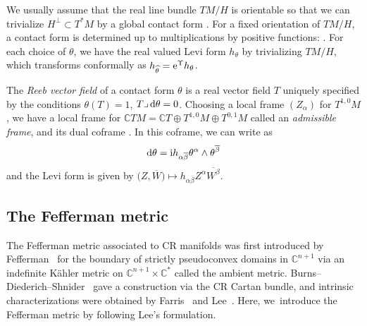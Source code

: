 \documentclass[11pt]{article}
\numberwithin{equation}{section}
\renewcommand\a{\alpha}
\renewcommand\b{\beta}
\renewcommand\th{\theta}
\newcommand\ol{\overline}
\newcommand{\wh}{\widehat}
\numberwithin{equation}{section}
\begin{document}
We usually assume that the real line bundle $TM/H$ is orientable so that we can trivialize $H^\perp \subset T^*M$ by a global contact form \smash{$\th\in \Gamma\bigl(H^\perp\bigr)$}. For a fixed orientation of $TM/H$, a contact form is determined up to multiplications by positive functions:
\smash{$\th\mapsto \wh\th={\rm e}^{\Upsilon}\th$, $\Upsilon\in C^\infty(M)$}. For each choice of $\th$, we have the real valued Levi form $h_\th$ by trivializing $TM/H$, which transforms conformally as $h_{\wh\th}={\rm e}^\Upsilon h_\th$.

The {\it Reeb vector field} of a contact form $\th$ is a real vector field $T$ uniquely
specified by the conditions $\th(T)=1$, $T\lrcorner\, {\rm d}\th=0$. Choosing a local frame $(Z_\a)$ for $T^{1, 0}M$, we have a local frame \smash{$\bigl(T, Z_\a, Z_{\ol\a}:=\ol{Z_\a}\bigr)$} for $\mathbb{C}TM=\mathbb{C}T\oplus T^{1, 0}M\oplus T^{0,1}M$ called an {\it admissible frame}, and its dual coframe \smash{$\bigl(\th, \th^\a, \th^{\ol\a}=\ol{\th^\a}\bigr)$}. In this coframe, we can write as
\[
{\rm d}\th={\rm i} h_{\a\ol\b}\th^\a\wedge\th^{\ol\b}
\]
and the Levi form is given by $\bigl(Z, \ol W\bigr)\mapsto h_{\a\ol\b}Z^\a \ol{W^\b}$.

\subsection{The Fefferman metric}\label{CR-Fefferman-metric}
The Fefferman metric associated to CR manifolds was first introduced by Fefferman~\cite{F} for the boundary of strictly pseudoconvex domains in $\mathbb{C}^{n+1}$ via an indefinite K\"ahler metric on $\mathbb{C}^{n+1}\times\mathbb{C}^*$ called the ambient metric. Burns--Diederich--Shnider~\cite{BDS} gave a construction via the CR Cartan bundle, and intrinsic characterizations were obtained by Farris~\cite{Fa} and Lee~\cite{Lee}.
Here, we~introduce the Fefferman metric by following Lee's formulation.
\end{document}
